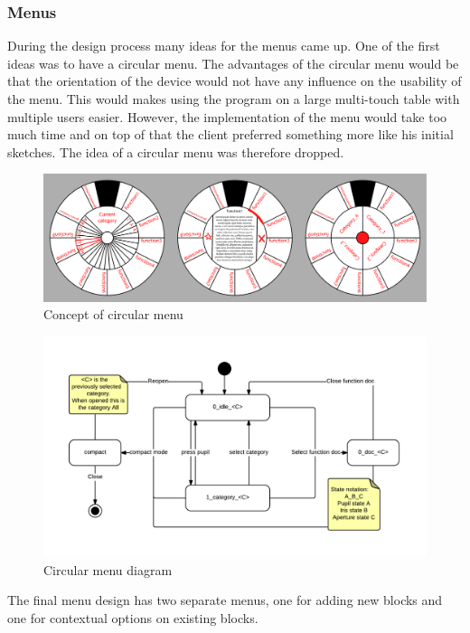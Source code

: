 \subsubsection{Menus}

During the design process many ideas for the menus came up.
One of the first ideas was to have a circular menu. \label{circular_menu} 
The advantages of the circular menu would be that the orientation of the device would not have any influence on the usability of the menu.
This would makes using the program on a large multi-touch table with multiple users easier.
However, the implementation of the menu would take too much time and on top of that the client preferred something more like his initial sketches. The idea of a circular menu was therefore dropped.

\begin{figure}[p]
	\centering
	\includegraphics[width=\textwidth]{Images/circlary}
	\caption{Concept of circular menu}
	\label{fig:circlary}
\end{figure}
\begin{figure}[p]
	\centering
	\includegraphics[scale=0.5]{Images/diagram-circlary}
	\caption{Circular menu diagram}
	\label{fig:diagram-circlary}
\end{figure}

The final menu design has two separate menus, one for adding new blocks and one for contextual options on existing blocks.

